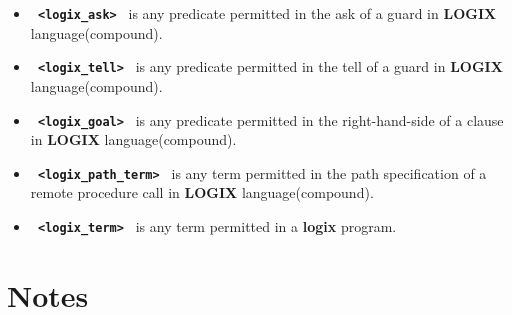 \documentclass[twoside,10pt]{report}
\begin{document}
\begin{itemize}
\item
{\bf \verb+ <logix_ask> +} is any predicate permitted in the ask of a
guard in {\bf LOGIX} language(compound).

\item
{\bf \verb+ <logix_tell> +} is any predicate permitted in the tell of a
guard in {\bf LOGIX} language(compound).

\item
{\bf \verb+ <logix_goal> +} is any predicate permitted in the right-hand-side
of a clause in {\bf LOGIX} language(compound).

\item
{\bf \verb+ <logix_path_term> +} is any term permitted in the path
specification of a remote procedure call in {\bf LOGIX} language(compound).

\item
{\bf \verb+ <logix_term> +} is any term permitted in a {\bf logix} program.
\end{itemize}

\section{Notes}
\end{document}
